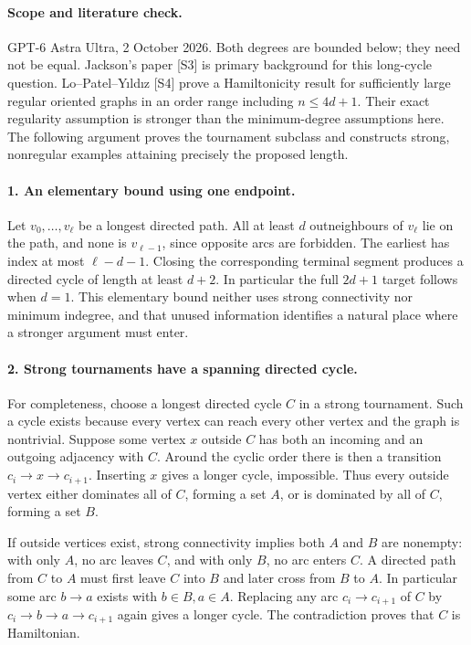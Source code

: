 \documentclass[11pt,a4paper]{article}
\begin{document}
\paragraph{Scope and literature check.}
GPT-6 Astra Ultra, 2 October 2026. Both degrees are bounded below;
they need not be equal. Jackson's paper [S3] is primary background
for this long-cycle question. Lo--Patel--Y\i ld\i z [S4] prove a
Hamiltonicity result for sufficiently large regular oriented graphs
in an order range including $n\le4d+1$. Their exact regularity
assumption is stronger than the minimum-degree assumptions here.
The following argument proves the tournament subclass and constructs
strong, nonregular examples attaining precisely the proposed length.

\paragraph{1. An elementary bound using one endpoint.}
Let $v_0,\ldots,v_\ell$ be a longest directed path. All at least $d$
outneighbours of $v_\ell$ lie on the path, and none is $v_{\ell-1}$,
since opposite arcs are forbidden. The earliest has index at most
$\ell-d-1$. Closing the corresponding terminal segment produces a
directed cycle of length at least $d+2$. In particular the full
$2d+1$ target follows when $d=1$. This elementary bound neither uses
strong connectivity nor minimum indegree, and that unused information
identifies a natural place where a stronger argument must enter.

\paragraph{2. Strong tournaments have a spanning directed cycle.}
For completeness, choose a longest directed cycle $C$ in a strong
tournament. Such a cycle exists because every vertex can reach every
other vertex and the graph is nontrivial. Suppose some vertex $x$
outside $C$ has both an incoming and an outgoing adjacency with $C$.
Around the cyclic order there is then a transition
$c_i\to x\to c_{i+1}$. Inserting $x$ gives a longer cycle, impossible.
Thus every outside vertex either dominates all of $C$, forming a
set $A$, or is dominated by all of $C$, forming a set $B$.

If outside vertices exist, strong connectivity implies both $A$ and
$B$ are nonempty: with only $A$, no arc leaves $C$, and with only
$B$, no arc enters $C$. A directed path from $C$ to $A$ must first
leave $C$ into $B$ and later cross from $B$ to $A$. In particular
some arc $b\to a$ exists with $b\in B,a\in A$. Replacing any arc
$c_i\to c_{i+1}$ of $C$ by
$c_i\to b\to a\to c_{i+1}$ again gives a longer cycle.
The contradiction proves that $C$ is Hamiltonian.
\end{document}
